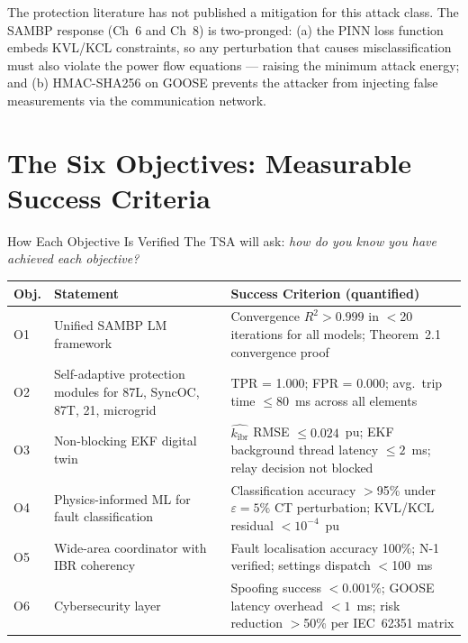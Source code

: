 \documentclass[12pt,a4paper]{article}
\newcommand{\kibr}{k_\mathrm{ibr}}
\begin{document}
The protection literature has not published a mitigation for this attack class.
The SAMBP response (Ch~6 and Ch~8) is two-pronged:
(a) the PINN loss function embeds KVL/KCL constraints, so any perturbation that
causes misclassification must also violate the power flow equations --- raising
the minimum attack energy; and (b) HMAC-SHA256 on GOOSE prevents the attacker
from injecting false measurements via the communication network.

\section{The Six Objectives: Measurable Success Criteria}

\begin{keybox}{How Each Objective Is Verified}
The TSA will ask: \emph{how do you know you have achieved each objective?}

\begin{center}
\small
\begin{tabular}{@{}lp{4.5cm}p{5cm}@{}}
\toprule
\textbf{Obj.} & \textbf{Statement} & \textbf{Success Criterion (quantified)} \\
\midrule
O1 & Unified SAMBP LM framework
   & Convergence $R^2 > 0.999$ in $<$20 iterations for all models;
     Theorem~2.1 convergence proof \\[4pt]
O2 & Self-adaptive protection modules for 87L, SyncOC, 87T, 21, microgrid
   & TPR = 1.000; FPR = 0.000; avg.\ trip time $\leq 80$~ms across all elements \\[4pt]
O3 & Non-blocking EKF digital twin
   & $\hat{\kibr}$ RMSE $\leq 0.024$~pu; EKF background thread latency $\leq 2$~ms;
     relay decision not blocked \\[4pt]
O4 & Physics-informed ML for fault classification
   & Classification accuracy $>$95\% under $\varepsilon = 5\%$ CT perturbation;
     KVL/KCL residual $< 10^{-4}$~pu \\[4pt]
O5 & Wide-area coordinator with IBR coherency
   & Fault localisation accuracy 100\%; N-1 verified; settings dispatch $<$100~ms \\[4pt]
O6 & Cybersecurity layer
   & Spoofing success $< 0.001\%$; GOOSE latency overhead $< 1$~ms;
     risk reduction $>$50\% per IEC~62351 matrix \\
\bottomrule
\end{tabular}
\end{center}
\end{keybox}
\end{document}
